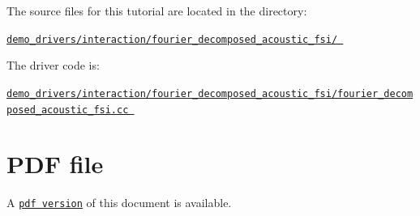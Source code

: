 \begin{DoxyItemize}
\item The source files for this tutorial are located in the directory\+: \begin{center} \href{../../../../demo_drivers/interaction/fourier_decomposed_acoustic_fsi}{\tt demo\+\_\+drivers/interaction/fourier\+\_\+decomposed\+\_\+acoustic\+\_\+fsi/ } \end{center} 
\item The driver code is\+: \begin{center} \href{../../../../demo_drivers/interaction/fourier_decomposed_acoustic_fsi/fourier_decomposed_acoustic_fsi.cc}{\tt demo\+\_\+drivers/interaction/fourier\+\_\+decomposed\+\_\+acoustic\+\_\+fsi/fourier\+\_\+decomposed\+\_\+acoustic\+\_\+fsi.\+cc } \end{center} 
\end{DoxyItemize}



 

 \hypertarget{index_pdf}{}\section{P\+D\+F file}\label{index_pdf}
A \href{../latex/refman.pdf}{\tt pdf version} of this document is available. 
